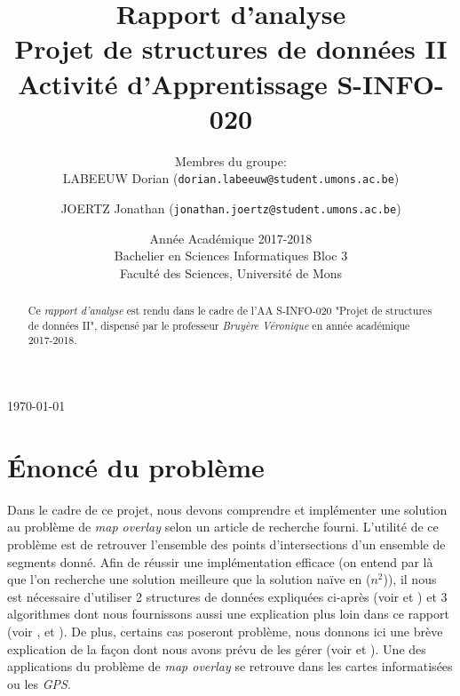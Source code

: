 \documentclass[]{article}
\begin{document}
\title{Rapport d'analyse\\
	Projet de structures de données II\\
	\smallskip
	{\small Activité d'Apprentissage \textsf{S-INFO-020}}\\
}
\author{
Membres du groupe:\\
LABEEUW Dorian (\texttt{dorian.labeeuw@student.umons.ac.be}) \and JOERTZ Jonathan (\texttt{jonathan.joertz@student.umons.ac.be})}

\date{Année Académique 2017-2018\\
Bachelier en Sciences Informatiques Bloc 3\\ 
\vspace{1cm}
Faculté des Sciences, Université de Mons}

\maketitle

\medskip
\begin{center} \today \end{center}
	\begin{abstract}
		Ce \emph{rapport d'analyse} est rendu dans le cadre de l'AA \textsf{S-INFO-020} "Projet de structures de données II", dispensé par le professeur \emph{Bruyère Véronique} en année académique 2017-2018.
	\end{abstract}

\newpage

\tableofcontents

\newpage

\section{Énoncé du problème}
Dans le cadre de ce projet, nous devons comprendre et implémenter une solution au problème de \emph{map overlay} selon un article de recherche fourni. L'utilité de ce problème est de retrouver l'ensemble des points d'intersections d'un ensemble de segments donné. Afin de réussir une implémentation efficace (on entend par là que l'on recherche une solution meilleure que la solution naïve en ($n^{2}$)), il nous est nécessaire d'utiliser 2 structures de données expliquées ci-après (voir  et ) et 3 algorithmes dont nous fournissons aussi une explication plus loin dans ce rapport (voir ,  et ). De plus, certains cas poseront problème, nous donnons ici une brève explication de la façon dont nous avons prévu de les gérer (voir  et ). Une des applications du problème de \emph{map overlay} se retrouve dans les cartes informatisées ou les \emph{GPS}.
\end{document}
